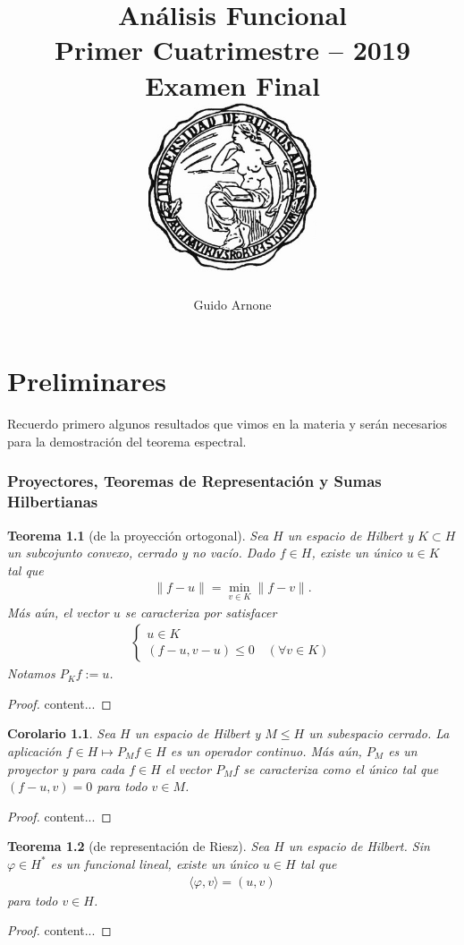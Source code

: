 \documentclass[11pt]{report}
\title{
\LARGE{Análisis Funcional}
\\
\vspace{1pt}
\small{Primer Cuatrimestre -- 2019}
\\
\vspace{0.5pt}
\large{Examen Final}
\\
\vspace{80pt}
{\includegraphics[height=5cm]{uba2.jpg}}
\vspace{80pt}
}
\author{Guido Arnone}
\date{}
\theoremstyle{colored}
\newtheorem{theorem}{Teorema}[section]
\newtheorem{corollary}{Corolario}[section]
\newcommand{\ip}[1]{( #1 )}
\begin{document}
\maketitle
\tableofcontents

\chapter{Preliminares}
Recuerdo primero algunos resultados que vimos en la materia y serán necesarios para la demostración del teorema espectral.
\subsection{Proyectores, Teoremas de Representación y Sumas Hilbertianas}

\begin{theorem}[de la proyección ortogonal] Sea $H$ un espacio de Hilbert y $K \subset H$ un subcojunto convexo, cerrado y no vacío. Dado $f \in H$, existe un único $u \in K$ tal que
\begin{align*}
\|f-u\| = \min_{v \in K}\|f-v\|.
\end{align*}
Más aún, el vector $u$ se caracteriza por satisfacer
\begin{align*}
\begin{cases}
u \in K\\
\ip{f-u,v-u} \leq 0 \quad (\forall v \in K)
\end{cases}
\end{align*}
Notamos $P_Kf := u$.
\end{theorem}
\begin{proof}
content...
\end{proof}

\begin{corollary} Sea $H$ un espacio de Hilbert y $M \leq H$ un subespacio cerrado. La aplicación $f \in H \mapsto P_Mf \in H$ es un operador continuo. Más aún, $P_M$ es un proyector y para cada $f \in H$ el vector $P_Mf$ se caracteriza como el único tal que $\ip{f-u,v} = 0$ para todo $v \in M$.
\end{corollary}
\begin{proof}
content...
\end{proof}

\begin{theorem}[de representación de Riesz] Sea $H$ un espacio de Hilbert. Sin $\varphi \in H^*$ es un funcional lineal, existe un único $u \in H$ tal que
\begin{align*}
\langle \varphi, v\rangle  = \ip{u,v}
\end{align*}
para todo $v \in H$.
\end{theorem}
\begin{proof}
content...
\end{proof}
\end{document}
